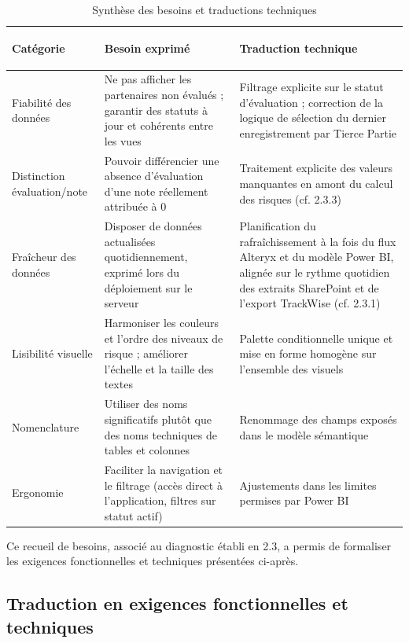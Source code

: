 \begin{table}[htbp]
\centering
\renewcommand{\arraystretch}{1.5}
\begin{tabularx}{\textwidth}{|>{\bfseries\raggedright\arraybackslash}p{3cm}|X|X|}
\hline
Catégorie & \textbf{Besoin exprimé} & \textbf{Traduction technique} \\
\hline
Fiabilité des données & Ne pas afficher les partenaires non évalués ; garantir des statuts à jour et cohérents entre les vues & Filtrage explicite sur le statut d'évaluation ; correction de la logique de sélection du dernier enregistrement par Tierce Partie \\
\hline

Distinction évaluation/note & Pouvoir différencier une absence d'évaluation d'une note réellement attribuée à 0 & Traitement explicite des valeurs manquantes en amont du calcul des risques (cf. 2.3.3) \\
\hline

Fraîcheur des données & Disposer de données actualisées quotidiennement, exprimé lors du déploiement sur le serveur & Planification du rafraîchissement à la fois du flux Alteryx et du modèle Power BI, alignée sur le rythme quotidien des extraits SharePoint et de l'export TrackWise (cf. 2.3.1) \\
\hline

Lisibilité visuelle & Harmoniser les couleurs et l'ordre des niveaux de risque ; améliorer l'échelle et la taille des textes & Palette conditionnelle unique et mise en forme homogène sur l'ensemble des visuels \\
\hline

Nomenclature & Utiliser des noms significatifs plutôt que des noms techniques de tables et colonnes & Renommage des champs exposés dans le modèle sémantique \\
\hline

Ergonomie & Faciliter la navigation et le filtrage (accès direct à l'application, filtres sur statut actif) & Ajustements dans les limites permises par Power BI \\
\hline
\end{tabularx}
\caption{Synthèse des besoins et traductions techniques}
\end{table}

Ce recueil de besoins, associé au diagnostic établi en 2.3, a permis de formaliser les 
exigences fonctionnelles et techniques présentées ci-après.

\subsection{Traduction en exigences fonctionnelles et techniques }

